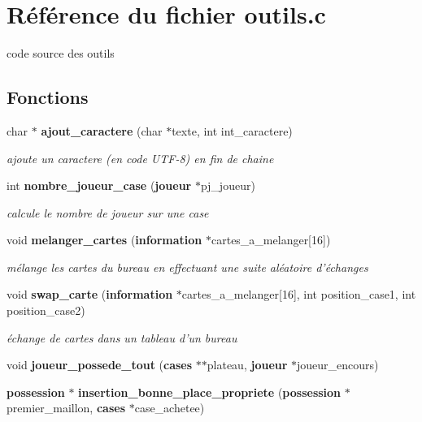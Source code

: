 \section{R\'{e}f\'{e}rence du fichier outils.c}
\label{outils_8c}
code source des outils 

\subsection*{Fonctions}
\begin{CompactItemize}
\item 
char $\ast$ {\bf ajout\_\-caractere} (char $\ast$texte, int int\_\-caractere)
\begin{CompactList}\small\item\em ajoute un caractere (en code UTF-8) en fin de chaine \item\end{CompactList}\item 
int {\bf nombre\_\-joueur\_\-case} ({\bf joueur} $\ast$pj\_\-joueur)
\begin{CompactList}\small\item\em calcule le nombre de joueur sur une case \item\end{CompactList}\item 
void {\bf melanger\_\-cartes} ({\bf information} $\ast$cartes\_\-a\_\-melanger[16])
\begin{CompactList}\small\item\em m\'{e}lange les cartes du bureau en effectuant une suite al\'{e}atoire d'\'{e}changes \item\end{CompactList}\item 
void {\bf swap\_\-carte} ({\bf information} $\ast$cartes\_\-a\_\-melanger[16], int position\_\-case1, int position\_\-case2)
\begin{CompactList}\small\item\em \'{e}change de cartes dans un tableau d'un bureau \item\end{CompactList}\item 
void {\bf joueur\_\-possede\_\-tout} ({\bf cases} $\ast$$\ast$plateau, {\bf joueur} $\ast$joueur\_\-encours)
\item 
{\bf possession} $\ast$ {\bf insertion\_\-bonne\_\-place\_\-propriete} ({\bf possession} $\ast$premier\_\-maillon, {\bf cases} $\ast$case\_\-achetee)
\item 
$$
\end{CompactItemize}
